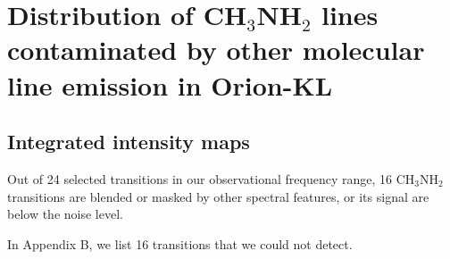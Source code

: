 \chapter{Distribution of CH$_{3}$NH$_{2}$ lines contaminated by other molecular line emission in Orion-KL
\label{chap:appendixB}}

\section{Integrated intensity maps}
Out of 24 selected transitions in our observational frequency range, 16 CH$_{3}$NH$_{2}$ transitions are 
blended or masked by other spectral features, or its signal are below the noise level.

In Appendix B, we list 16 transitions that we could not detect.
\newpage

